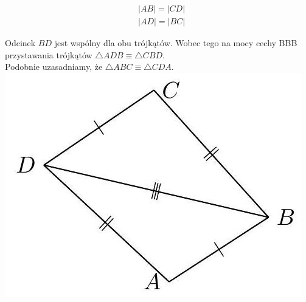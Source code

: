 \documentclass[10pt]{article}
\begin{document}
\[
\begin{aligned}
& |A B|=|C D| \\
& |A D|=|B C|
\end{aligned}
\]

Odcinek \(B D\) jest wspólny dla obu trójkątów. Wobec tego na mocy cechy BBB przystawania trójkątów \(\triangle A D B \equiv \triangle C B D\).\\
Podobnie uzasadniamy, że \(\triangle A B C \equiv \triangle C D A\).\\
\includegraphics[max width=\textwidth, center]{2024_11_21_71f62bd117d375398909g-046(2)}
\end{document}

